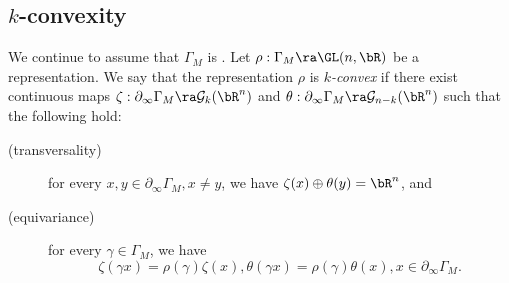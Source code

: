 \subsection{$k$-convexity} \label{sub:kconvexity} 

We continue to assume that $\Gamma_M$ is . 
Let $\rho:\Gamma_M \ra \GL(n, \bR)$ be a representation. 
%
%
%
%
We say that the representation $\rho$ is {\em  $k$-convex} if there exist continuous maps 
$\zeta: \partial_\infty \Gamma_M \ra \mathcal{G}_k(\bR^n)$ and $\theta:\partial_\infty \Gamma_M\ra \mathcal{G}_{n-k}(\bR^n)$ such that the following hold:
\begin{description} 
	\item[(transversality)] for every $x,y\in\partial_\infty \Gamma_M,x\ne y$, we have $\zeta(x)\oplus\theta(y)=\bR^n$, and
	\item[(equivariance)] for every $\gamma \in \Gamma_M$, 
	we have \[\zeta(\gamma x) = \rho(\gamma)\zeta(x), \theta(\gamma x) = \rho(\gamma)\theta(x), x \in \partial_\infty \Gamma_M.\]
\end{description}

